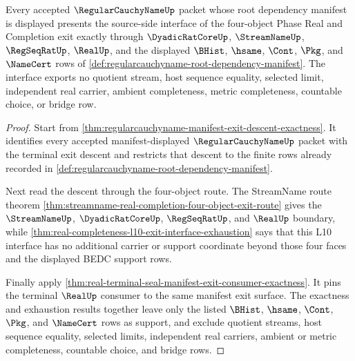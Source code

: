 \begin{theorem}
\label{thm:regularcauchyname-phase-real-completion-exit-interface}
Every accepted $\RegularCauchyNameUp$ packet whose root dependency manifest is displayed presents the source-side interface of the four-object Phase Real and Completion exit exactly through $\DyadicRatCoreUp$, $\StreamNameUp$, $\RegSeqRatUp$, $\RealUp$, and the displayed $\BHist$, $\hsame$, $\Cont$, $\Pkg$, and $\NameCert$ rows of \autoref{def:regularcauchyname-root-dependency-manifest}. The interface exports no quotient stream, host sequence equality, selected limit, independent real carrier, ambient completeness, metric completeness, countable choice, or bridge row.
\end{theorem}
\begin{proof}
Start from \autoref{thm:regularcauchyname-manifest-exit-descent-exactness}. It identifies every accepted manifest-displayed $\RegularCauchyNameUp$ packet with the terminal exit descent and restricts that descent to the finite rows already recorded in \autoref{def:regularcauchyname-root-dependency-manifest}.

Next read the descent through the four-object route. The StreamName route theorem \autoref{thm:streamname-real-completion-four-object-exit-route} gives the $\StreamNameUp$, $\DyadicRatCoreUp$, $\RegSeqRatUp$, and $\RealUp$ boundary, while \autoref{thm:real-completeness-l10-exit-interface-exhaustion} says that this L10 interface has no additional carrier or support coordinate beyond those four faces and the displayed BEDC support rows.

Finally apply \autoref{thm:real-terminal-seal-manifest-exit-consumer-exactness}. It pins the terminal $\RealUp$ consumer to the same manifest exit surface. The exactness and exhaustion results together leave only the listed $\BHist$, $\hsame$, $\Cont$, $\Pkg$, and $\NameCert$ rows as support, and exclude quotient streams, host sequence equality, selected limits, independent real carriers, ambient or metric completeness, countable choice, and bridge rows.
\end{proof}

